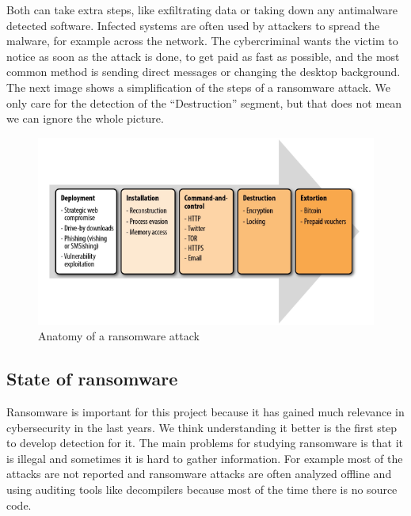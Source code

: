 \linej
Both can take extra steps, like exfiltrating data or taking down any antimalware detected software.
Infected systems are often used by attackers to spread the malware, for example across the network.
The cybercriminal wants the victim to notice as soon as the attack is done, to get paid as fast as possible, and the most common method is sending direct messages or changing the desktop background.
\linej
\linej
The next image shows a simplification of the steps of a ransomware attack.
We only care for the detection of the ``Destruction'' segment, but that does not mean we can ignore the whole picture.
\begin{figure}[H]
	\centering
	\includegraphics[width=\textwidth]{figuras/anatomy_of_a_ransomware_attack.png}
	\caption{Anatomy of a ransomware attack\cite{ransomware_oReilly}}
\end{figure}

\subsection{State of ransomware}
Ransomware is important for this project because it has gained much relevance in cybersecurity in the last years.
We think understanding it better is the first step to develop detection for it.
\linej
\linej
The main problems for studying ransomware is that it is illegal and sometimes it is hard to gather information.
For example most of the attacks are not reported and ransomware attacks are often analyzed offline and using auditing tools like decompilers because most of the time there is no source code\cite{ransomware_digital_extortion}.

